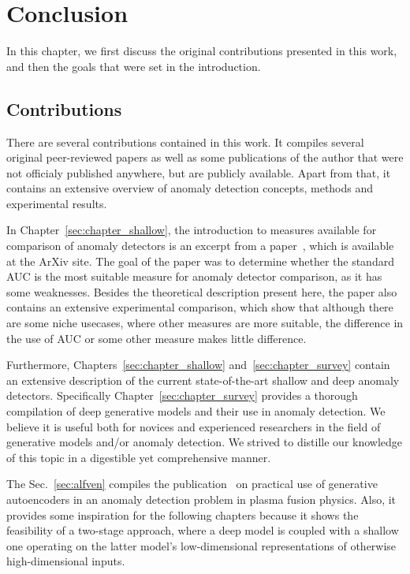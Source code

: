 \chapter{Conclusion} \label{sec:conclusion}
In this chapter, we first discuss the original contributions presented in this work, and then the goals that were set in the introduction.

\section{Contributions}
There are several contributions contained in this work. It compiles several original peer-reviewed papers as well as some publications of the author that were not officialy published anywhere, but are publicly available. Apart from that, it contains an extensive overview of anomaly detection concepts, methods and experimental results.

In Chapter~\ref{sec:chapter_shallow}, the introduction to measures available for comparison of anomaly detectors is an excerpt from a paper~\cite{vskvara2023auc}, which is available at the ArXiv site. The goal of the paper was to determine whether the standard AUC is the most suitable measure for anomaly detector comparison, as it has some weaknesses. Besides the theoretical description present here, the paper also contains an extensive experimental comparison, which show that although there are some niche usecases, where other measures are more suitable, the difference in the use of AUC or some other measure makes little difference. 

Furthermore, Chapters~\ref{sec:chapter_shallow} and~\ref{sec:chapter_survey} contain an extensive description of the current state-of-the-art shallow and deep anomaly detectors. Specifically Chapter~\ref{sec:chapter_survey} provides a thorough compilation of deep generative models and their use in anomaly detection. We believe it is useful both for novices and experienced researchers in the field of generative models and/or anomaly detection. We strived to distille our knowledge of this topic in a digestible yet comprehensive manner.

The Sec.~\ref{sec:alfven} compiles the publication~\cite{vskvara2020detection} on practical use of generative autoencoders in an anomaly detection problem in plasma fusion physics. Also, it provides some inspiration for the following chapters because it shows the feasibility of a two-stage approach, where a deep model is coupled with a shallow one operating on the latter model's low-dimensional representations of otherwise high-dimensional inputs.

